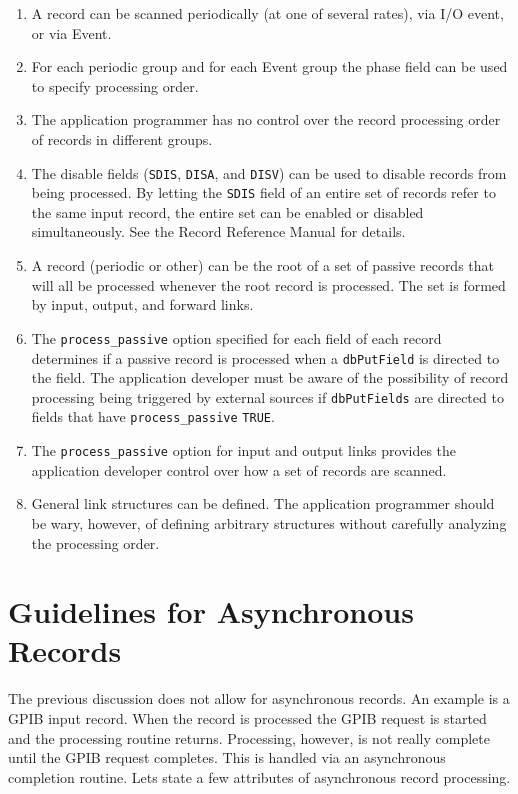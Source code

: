 \begin{enumerate}\item A record can be scanned periodically (at one of several rates), via I/O event, or via Event.

\item For each periodic group and for each Event group the phase field can be used to specify processing order.

\item The application programmer has no control over the record processing order of records in different groups.

\item The disable fields (\verb|SDIS|, \verb|DISA|, and \verb|DISV|) can be used to disable records from being processed. By letting the 
\verb|SDIS| field of an entire set of records refer to the same input record, the entire set can be enabled or disabled 
simultaneously. See the Record Reference Manual for details.

\item A record (periodic or other) can be the root of a set of passive records that will all be processed whenever the root 
record is processed. The set is formed by input, output, and forward links.

\item The \verb|process_passive| option specified for each field of each record determines if a passive record is processed 
when a \verb|dbPutField| is directed to the field. The application developer must be aware of the possibility of record 
processing being triggered by external sources if \verb|dbPutFields| are directed to fields that have 
\verb|process_passive| \verb|TRUE|.

\item The \verb|process_passive| option for input and output links provides the application developer control over how a 
set of records are scanned.

\item General link structures can be defined. The application programmer should be wary, however, of defining arbitrary 
structures without carefully analyzing the processing order. 

\end{enumerate}\section{Guidelines for Asynchronous Records}

The previous discussion does not allow for asynchronous records. An example is a GPIB input record. When the record is 
processed the GPIB request is started and the processing routine returns. Processing, however, is not really complete until 
the GPIB request completes. This is handled via an asynchronous completion routine. Lets state a few attributes of 
asynchronous record processing. 

